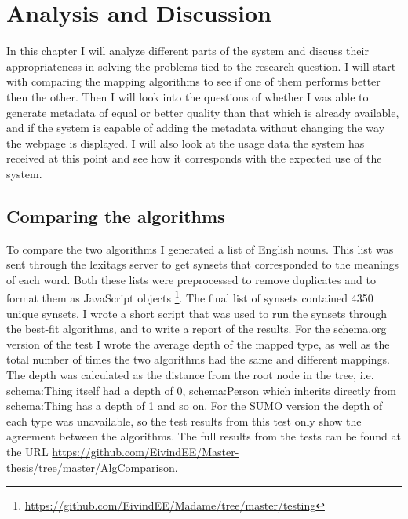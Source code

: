 
\chapter{Analysis and Discussion} %

\label{AnalysisAndDiscussion}


In this chapter I will analyze different parts of the system and discuss their appropriateness in solving the
problems tied to the research question.
I will start with comparing the mapping algorithms to see if one of them performs better then the other.
Then I will look into the questions of whether I was able to generate metadata of equal or better quality than that
which is already available, and if the system is capable of adding the metadata without changing the way the webpage is displayed.
I will also look at the usage data the system has received at this point and see how it corresponds with the expected use of the system.

\section{Comparing the algorithms}
\label{ComparingAlgorithms}
To compare the two algorithms I generated a list of English nouns.
This list was sent through the lexitags server to get synsets that corresponded to the meanings of each word.
Both these lists were preprocessed to remove duplicates and to format them as JavaScript objects
\footnote{\url{https://github.com/EivindEE/Madame/tree/master/testing}}.
The final list of synsets contained 4350 unique synsets.
I wrote a short script that was used to run the synsets through the best-fit algorithms,
and to write a report of the results.
For the schema.org version of the test I wrote the average depth of the mapped type,
as well as the total number of times the two algorithms had the same and different mappings.
The depth was calculated as the distance from the root node in the tree,
i.e. schema:Thing itself had a depth of 0,
schema:Person which inherits directly from schema:Thing has a depth of 1 and so on.
For the SUMO version the depth of each type was unavailable,
so the test results from this test only show the agreement between the algorithms.
The full results from the tests can be found at the URL \url{https://github.com/EivindEE/Master-thesis/tree/master/AlgComparison}.

